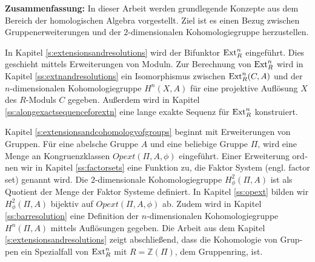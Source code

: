 \begin{otherlanguage}{german}
\textbf{Zusammenfassung:}
In dieser Arbeit werden grundlegende Konzepte aus dem Bereich der homologischen Algebra vorgestellt.
Ziel ist es einen Bezug zwischen Gruppenerweiterungen und der $2$-dimensionalen Kohomologiegruppe herzustellen.

In Kapitel \ref{s:extensionsandresolutions} wird der Bifunktor $\operatorname{Ext}^{n}_R$ eingeführt.
Dies geschieht mittels Erweiterungen von Moduln. 
Zur Berechnung von $\operatorname{Ext}^{n}_R$ wird in Kapitel \ref{ss:extnandresolutions} ein Isomorphismus zwischen $\operatorname{Ext}^{n}_R(C,A)$ und der $n$-dimensionalen Kohomologiegruppe $H^n(X,A)$ für eine projektive Auflösung $X$ des $R$-Moduls $C$ gegeben.
Außerdem wird in Kapitel \ref{ss:alongexactsequenceforextn} eine lange exakte Sequenz für $\operatorname{Ext}^{n}_R$ konstruiert.

Kapitel \ref{s:extensionsandcohomologyofgroups} beginnt mit Erweiterungen von Gruppen.
Für eine abelsche Gruppe $A$ und eine beliebige Gruppe $\Pi$, wird eine Menge an Kongruenzklassen $Opext(\Pi,A,\phi)$ eingeführt.
Einer Erweiterung ordnen wir in Kapitel \ref{ss:factorsets} eine Funktion zu, die  Faktor System (engl. factor set) genannt wird.
Die $2$-dimensionale Kohomologiegruppe $H^2_\phi(\Pi,A)$ ist als Quotient der Menge der Faktor Systeme definiert.
In Kapitel \ref{ss:opext} bilden wir $H^2_\phi(\Pi,A)$ bijektiv auf $Opext(\Pi,A,\phi)$ ab.
Zudem wird in Kapitel \ref{ss:barresolution} eine Definition der $n$-dimensionalen Kohomologiegruppe $H^n(\Pi,A)$ mittels Auflösungen gegeben.
Die Arbeit aus dem Kapitel \ref{s:extensionsandresolutions} zeigt abschließend, dass die Kohomologie von Gruppen ein Spezialfall von $\operatorname{Ext}^{n}_R$ mit $R=\mathbb{Z}(\Pi)$, dem Gruppenring, ist.
\end{otherlanguage}